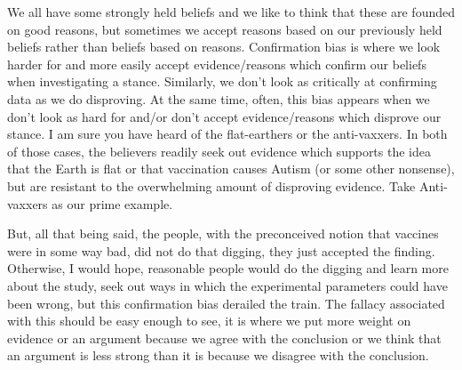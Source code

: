 We all have some strongly held beliefs and we like to think that these are founded on good reasons, but sometimes we accept reasons based on our previously held beliefs rather than beliefs based on reasons. Confirmation bias is where we look harder for and more easily accept evidence/reasons which confirm our beliefs when investigating a stance. Similarly, we don't look as critically at confirming data as we do disproving.  At the same time, often, this bias appears when we don't look as hard for and/or don't accept evidence/reasons which disprove our stance. I am sure you have heard of the flat-earthers or the anti-vaxxers. In both of those cases, the believers readily seek out evidence which supports the idea that the Earth is flat or that vaccination causes Autism (or some other nonsense), but are resistant to the overwhelming amount of disproving evidence.  Take Anti-vaxxers as our prime example.

But, all that being said, the people, with the preconceived notion that vaccines were in some way bad, did not do that digging, they just accepted the finding. Otherwise, I would hope, reasonable people would do the digging and learn more about the study, seek out ways in which the experimental parameters could have been wrong, but this confirmation bias derailed the train. The fallacy associated with this should be easy enough to see, it is where we put more weight on evidence or an argument because we agree with the conclusion or we think that an argument is less strong than it is because we disagree with the conclusion. 
